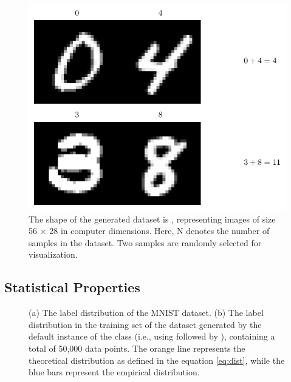 \documentclass{article}
\begin{document}
\begin{figure}[!htbp]
    \centering
    \includegraphics[width=0.6\linewidth]{./images/example_additions.pdf}
    \caption{The shape of the generated dataset is , representing images of size 56 × 28 in computer dimensions. Here, N denotes the number of samples in the dataset. Two samples are randomly selected for visualization.}
\end{figure}


\subsection{Statistical Properties}

\begin{figure}[!htbp]
    \centering
    \hspace{0.0\textwidth}
    \caption{(a) The label distribution of the MNIST dataset.  
(b) The label distribution in the training set of the dataset generated by the default instance of the  class (i.e., using  followed by ), containing a total of 50,000 data points. The orange line represents the theoretical distribution as defined in the equation \ref{eq:dist}, while the blue bars represent the empirical distribution.}
    \label{fig:two_dists}
\end{figure}
\end{document}
